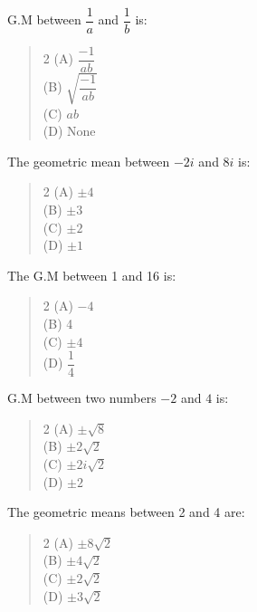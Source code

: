 \documentclass[11pt,a4paper]{article}
\begin{document}
\begin{mcqlist}
\item G.M between $\dfrac{1}{a}$ and $\dfrac{1}{b}$ is:
\begin{quote}\begin{multicols}{2}
\noindent (A) $\dfrac{-1}{ab}$ \\
(B) $\sqrt{\dfrac{-1}{ab}}$ \\
(C) $ab$ \\
(D) None
\end{multicols}\end{quote}

\item The geometric mean between $-2i$ and $8i$ is:
\begin{quote}\begin{multicols}{2}
\noindent (A) $\pm4$ \\
(B) $\pm3$ \\
(C) $\pm2$ \\
(D) $\pm1$
\end{multicols}\end{quote}

\item The G.M between 1 and 16 is:
\begin{quote}\begin{multicols}{2}
\noindent (A) $-4$ \\
(B) 4 \\
(C) $\pm4$ \\
(D) $\dfrac{1}{4}$
\end{multicols}\end{quote}

\item G.M between two numbers $-2$ and $4$ is:
\begin{quote}\begin{multicols}{2}
\noindent (A) $\pm\sqrt{8}$ \\
(B) $\pm2\sqrt{2}$ \\
(C) $\pm2i\sqrt{2}$ \\
(D) $\pm2$
\end{multicols}\end{quote}

\item The geometric means between 2 and 4 are:
\begin{quote}\begin{multicols}{2}
\noindent (A) $\pm8\sqrt{2}$ \\
(B) $\pm4\sqrt{2}$ \\
(C) $\pm2\sqrt{2}$ \\
(D) $\pm3\sqrt{2}$
\end{multicols}\end{quote}


\end{mcqlist}
\end{document}
